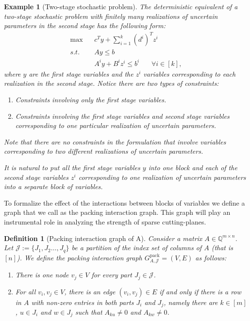 \documentclass[smallextended]{svjour3}
\newtheorem{definition}[proposition]{Definition}
\newtheorem{example}[proposition]{Example}
\begin{document}
\begin{example}[Two-stage stochastic problem]\label{ex:2stage}
The deterministic equivalent of a two-stage stochastic problem with finitely many realizations of uncertain parameters in the second stage has the following form:
		\begin{align*}
		\max ~~~~& c^T y + \sum_{i = 1}^k (d^i)^T z^i\\
	  s.t. ~~~~& A y \le b\\
	    	     & A^i y + B^i z^i \le b^i ~~~~~~~~\forall i \in [k],
	\end{align*}
	where $y$ are the first stage variables and the $z^i$ variables corresponding to each realization in the second stage. Notice there are two types of constraints:
\begin{enumerate}
\item Constraints involving only the first stage variables.
\item Constraints involving the first stage variables and second stage variables corresponding to one particular realization of uncertain parameters.
\end{enumerate}
Note that there are no constraints in the formulation that involve variables corresponding to two different realizations of uncertain parameters. 

It is natural to put all the first stage variables $y$ into one block and each of the second stage variables $z^i$ corresponding to one realization of uncertain parameters into a separate block of variables. 
\end{example} 

To formalize the effect of the interactions between blocks of variables we define a graph that we call as the packing interaction graph. This graph will play an instrumental role in analyzing the strength of sparse cutting-planes.

\begin{definition}[Packing interaction graph of A]\label{defn:packgraph}
Consider a matrix $A \in \mathbb{Q}^{m \times n}$. Let $\mathcal{J}:= \{J_1, J_2 \dots, J_q\}$ be a partition of the index set of columns of $A$ (that is $[n]$). We define the \emph{packing interaction graph} ${G^{\textrm{pack}}_{A, {\mathcal{J}}}} = (V,E)$ as follows: 
\begin{enumerate}
\item There is one node $v_j \in V$ for every part $J_j \in \mathcal{J}$. 
\item For all $v_i, v_j \in V$, there is an edge $(v_i, v_j) \in E$ if and only if there is a row in $A$ with non-zero entries in both parts $J_i$ and $J_j$, namely there are $k \in [m]$, $u \in J_i$ and $w \in J_j$ such that $A_{ku} \neq 0$ and $A_{kw} \neq 0$.
\end{enumerate}
\end{definition}
\end{document}
